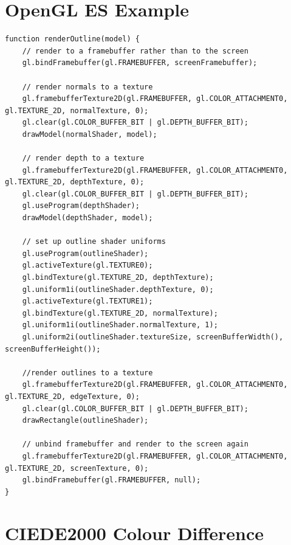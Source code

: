 \documentclass[12pt,twoside,notitlepage]{report}
\begin{document}



\cleardoublepage

\appendix

\chapter{OpenGL ES Example}

\label{app:gles}

\begin{lstlisting}[caption =Building a texture containing the model outline]
function renderOutline(model) {
	// render to a framebuffer rather than to the screen
	gl.bindFramebuffer(gl.FRAMEBUFFER, screenFramebuffer);
	
	// render normals to a texture
	gl.framebufferTexture2D(gl.FRAMEBUFFER, gl.COLOR_ATTACHMENT0, gl.TEXTURE_2D, normalTexture, 0);
	gl.clear(gl.COLOR_BUFFER_BIT | gl.DEPTH_BUFFER_BIT);
	drawModel(normalShader, model);
	
	// render depth to a texture
	gl.framebufferTexture2D(gl.FRAMEBUFFER, gl.COLOR_ATTACHMENT0, gl.TEXTURE_2D, depthTexture, 0);
	gl.clear(gl.COLOR_BUFFER_BIT | gl.DEPTH_BUFFER_BIT);
	gl.useProgram(depthShader);
	drawModel(depthShader, model);
	
	// set up outline shader uniforms
	gl.useProgram(outlineShader);
	gl.activeTexture(gl.TEXTURE0);
	gl.bindTexture(gl.TEXTURE_2D, depthTexture);
	gl.uniform1i(outlineShader.depthTexture, 0);
	gl.activeTexture(gl.TEXTURE1);
	gl.bindTexture(gl.TEXTURE_2D, normalTexture);
	gl.uniform1i(outlineShader.normalTexture, 1);
	gl.uniform2i(outlineShader.textureSize, screenBufferWidth(), screenBufferHeight());
	
	//render outlines to a texture
	gl.framebufferTexture2D(gl.FRAMEBUFFER, gl.COLOR_ATTACHMENT0, gl.TEXTURE_2D, edgeTexture, 0);
	gl.clear(gl.COLOR_BUFFER_BIT | gl.DEPTH_BUFFER_BIT);
	drawRectangle(outlineShader);
	
	// unbind framebuffer and render to the screen again
	gl.framebufferTexture2D(gl.FRAMEBUFFER, gl.COLOR_ATTACHMENT0, gl.TEXTURE_2D, screenTexture, 0);
	gl.bindFramebuffer(gl.FRAMEBUFFER, null);
}
\end{lstlisting}

\chapter{CIEDE2000 Colour Difference}

\label{app:ciede2000}
\end{document}

